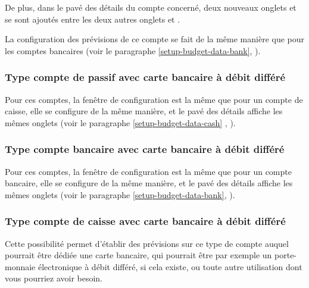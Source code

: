 De plus, dans le pavé des détails du compte concerné, deux nouveaux onglets  et  se sont ajoutés entre les deux autres onglets  et .

La configuration des prévisions de ce compte se fait de la même manière que pour les comptes bancaires (voir le paragraphe \vref{setup-budget-data-bank}, ).



\subsubsection{Type compte de passif avec carte bancaire à débit différé\label{setup-budget-data-liabilityWithCard}}

Pour ces comptes, la fenêtre de configuration est la même que pour un compte de caisse, elle se configure de la même manière, et le pavé des détails affiche les mêmes onglets (voir le paragraphe \vref{setup-budget-data-cash} , ).

\ifIllustration
\newpage
\fi


\subsubsection{Type compte bancaire avec carte bancaire à débit différé\label{setup-budget-data-bankWithCard}}

Pour ces comptes, la fenêtre de configuration est la même que pour un compte bancaire, elle se configure de la même manière, et le pavé des détails affiche les mêmes onglets (voir le paragraphe \vref{setup-budget-data-bank}, ).


\subsubsection{Type compte de caisse avec carte bancaire à débit différé\label{setup-budget-data-cashWithCard}}

Cette possibilité permet d'établir des prévisions sur ce type de compte auquel pourrait être dédiée une carte bancaire, qui pourrait être par exemple un porte-monnaie électronique à débit différé, si cela existe, ou toute autre utilisation dont vous pourriez avoir besoin.

